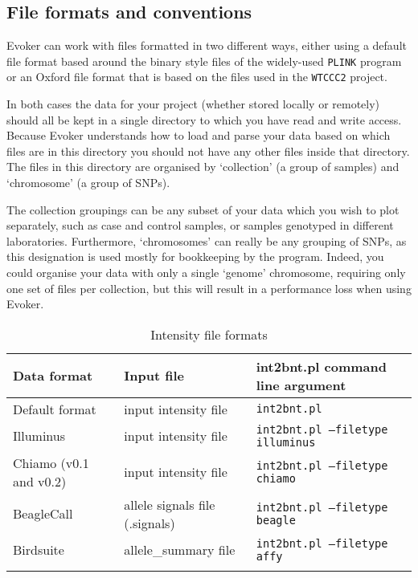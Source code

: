 \documentclass{article}
\begin{document}
\subsection{File formats and conventions}

Evoker can work with files formatted in two different ways, either using a default file format based around the binary style files of the widely-used \texttt{PLINK} program or an Oxford file format that is based on the files used in the \texttt{WTCCC2} project. 

In both cases the data for your project (whether stored locally or remotely) should all be kept in a single directory to which you have read and write access. Because Evoker understands how to load and parse your data based on which files are in this directory you should not have any other files inside that directory. The files in this directory are organised by `collection' (a group of samples) and `chromosome' (a group of SNPs).

The collection groupings can be any subset of your data which you wish to plot separately, such as case and control samples, or samples genotyped in different laboratories. Furthermore, `chromosomes' can really be any grouping of SNPs, as this designation is used mostly for bookkeeping by the program. Indeed, you could organise your data with only a single `genome' chromosome, requiring only one set of files per collection, but this will result in a performance loss when using Evoker.

\begin{table}
  \begin{center}
    \caption[Intensity file formats]{Intensity file formats}
    \vspace{0.2cm}
    \label{FileFormats}
    \begin{tabular}[p]{ l l l}
     \toprule[1.5pt]
      Data format & Input file & int2bnt.pl command line argument \\
      \midrule
		Default format & input intensity file & \texttt{int2bnt.pl}\\
		Illuminus & input intensity file & \texttt{int2bnt.pl --filetype illuminus}\\
		Chiamo (v0.1 and v0.2) & input intensity file & \texttt{int2bnt.pl --filetype chiamo}\\
		BeagleCall & allele signals file (.signals) & \texttt{int2bnt.pl --filetype beagle}\\
		Birdsuite & allele\_summary file & \texttt{int2bnt.pl --filetype affy}\\
      \addlinespace      
      \bottomrule[0.5pt]
    \end{tabular}
  \end{center}
\end{table}
\end{document}
